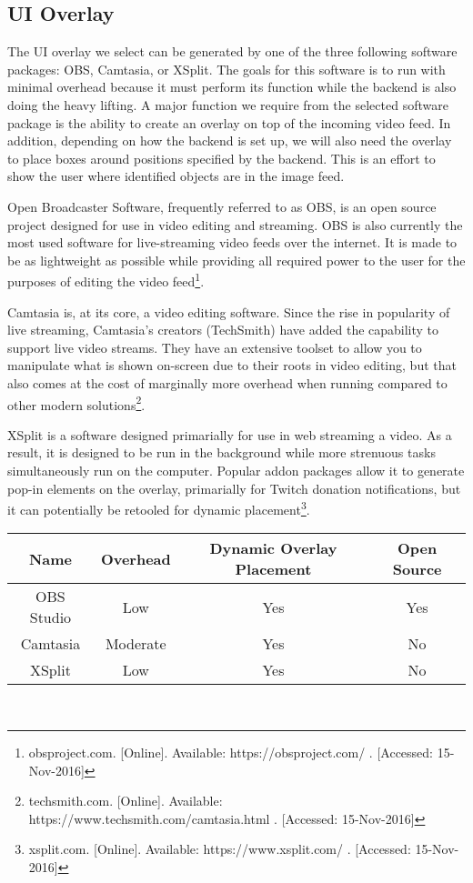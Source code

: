 \documentclass[letterpaper,10pt,onecolumn,draftclsnofoot]{IEEEtran}
\begin{document}
\newpage
\subsection{UI Overlay} %

The UI overlay we select can be generated by one of the three following software packages:  OBS, Camtasia, or XSplit.  The goals for this software is to run with minimal overhead because it must perform its function while the backend is also doing the heavy lifting.  A major function we require from the selected software package is the ability to create an overlay on top of the incoming video feed.  In addition, depending on how the backend is set up, we will also need the overlay to place boxes around positions specified by the backend.  This is an effort to show the user where identified objects are in the image feed.

Open Broadcaster Software, frequently referred to as OBS, is an open source project designed for use in video editing and streaming.  OBS is also currently the most used software for live-streaming video feeds over the internet.  It is made to be as lightweight as possible while providing all required power to the user for the purposes of editing the video feed\footnote{obsproject.com. [Online]. Available: https://obsproject.com/ . [Accessed: 15-Nov-2016] }.

Camtasia is, at its core, a video editing software.  Since the rise in popularity of live streaming, Camtasia's creators (TechSmith) have added the capability to support live video streams.  They have an extensive toolset to allow you to manipulate what is shown on-screen due to their roots in video editing, but that also comes at the cost of marginally more overhead when running compared to other modern solutions\footnote{techsmith.com. [Online]. Available: https://www.techsmith.com/camtasia.html . [Accessed: 15-Nov-2016] }.

XSplit is a software designed primarially for use in web streaming a video.  As a result, it is designed to be run in the background while more strenuous tasks simultaneously run on the computer.  Popular addon packages allow it to generate pop-in elements on the overlay, primarially for Twitch donation notifications, but it can potentially be retooled for dynamic placement\footnote{xsplit.com. [Online]. Available: https://www.xsplit.com/ . [Accessed: 15-Nov-2016] }. \\

\begin{tabular}{|c|c|c|c|}
  \hline
  \textbf{Name} & \textbf{Overhead} & \textbf{Dynamic Overlay Placement} & \textbf{Open Source} \\
  \hline
  OBS Studio & Low & Yes & Yes \\ 
  \hline
  Camtasia & Moderate & Yes & No  \\ 
  \hline
  XSplit & Low & Yes & No \\ 
  \hline
\end{tabular} \\
\end{document}
